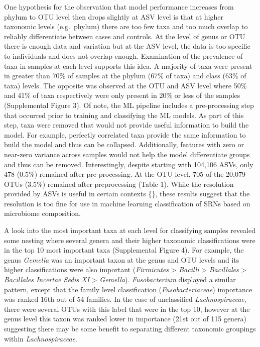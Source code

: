 \documentclass[
]{article}
\begin{document}
One hypothesis for the observation that model performance increases from
phylum to OTU level then drops slightly at ASV level is that at higher
taxonomic levels (e.g.~phylum) there are too few taxa and too much
overlap to reliably differentiate between cases and controls. At the
level of genus or OTU there is enough data and variation but at the ASV
level, the data is too specific to individuals and does not overlap
enough. Examination of the prevalence of taxa in samples at each level
supports this idea. A majority of taxa were present in greater than 70\%
of samples at the phylum (67\% of taxa) and class (63\% of taxa) levels.
The opposite was observed at the OTU and ASV level where 50\% and 41\%
of taxa respectively were only present in 20\% or less of the samples
(Supplemental Figure 3). Of note, the ML pipeline includes a
pre-processing step that occurred prior to training and classifying the
ML models. As part of this step, taxa were removed that would not
provide useful information to build the model. For example, perfectly
correlated taxa provide the same information to build the model and thus
can be collapsed. Additionally, features with zero or near-zero variance
across samples would not help the model differentiate groups and thus
can be removed. Interestingly, despite starting with 104,106 ASVs, only
478 (0.5\%) remained after pre-processing. At the OTU level, 705 of the
20,079 OTUs (3.5\%) remained after preprocessing (Table 1). While the
resolution provided by ASVs is useful in certain contexts \{\}, these
results suggest that the resolution is too fine for use in machine
learning classification of SRNs based on microbiome composition.

A look into the most important taxa at each level for classifying
samples revealed some nesting where several genera and their higher
taxonomic classifications were in the top 10 most important taxa
(Supplemental Figure 4). For example, the genus \emph{Gemella} was an
important taxon at the genus and OTU levels and its higher
classifications were also important (\emph{Firmicutes} \textgreater{}
\emph{Bacilli} \textgreater{} \emph{Bacillales} \textgreater{}
\emph{Bacillales Incertae Sedis XI} \textgreater{} \emph{Gemella}).
\emph{Fusobacterium} displayed a similar pattern, except that the family
level classification (\emph{Fusobacteriaceae}) importance was ranked
16th out of 54 families. In the case of unclassified
\emph{Lachnospiraceae}, there were several OTUs with this label that
were in the top 10, however at the genus level this taxon was ranked
lower in importance (21st out of 115 genera) suggesting there may be
some benefit to separating different taxonomic groupings within
\emph{Lachnospiraceae}.
\end{document}
